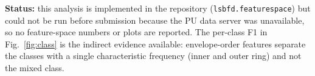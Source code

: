 \textbf{Status:} this analysis is implemented in the repository
(\texttt{lsbfd.featurespace}) but could not be run before submission because the PU data server
was unavailable, so no feature-space numbers or plots are reported. The per-class F1 in
Fig.~\ref{fig:class} is the indirect evidence available: envelope-order features separate the
classes with a single characteristic frequency (inner and outer ring) and not the mixed class.
